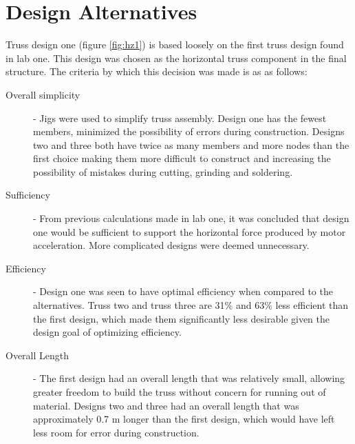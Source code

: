 \section{Design Alternatives}

Truss design one (figure \ref{fig:hz1}) is based loosely on the first truss design found in lab one. 
This design was chosen as the horizontal truss component in the final structure. 
The criteria by which this decision was made is as as follows:

\begin{description}

\item[Overall simplicity] - Jigs were used to simplify truss assembly.
Design one has the fewest members, minimized the possibility of errors during construction.
Designs two and three both have twice as many members and more nodes than the first choice making them more difficult to construct and increasing the possibility of mistakes during cutting, grinding and soldering.

\item[Sufficiency] - %
From previous calculations made in lab one, it was concluded that design one would be sufficient to support the horizontal force produced by motor acceleration.
More complicated designs were deemed unnecessary.

\item[Efficiency] - Design one was seen to have optimal efficiency when compared to the alternatives.
Truss two and truss three are 31\% and 63\% less efficient than the first design, which made them significantly less desirable given the design goal of optimizing efficiency. 

\item[Overall Length] - The first design had an overall length that was relatively small, allowing greater freedom to build the truss without concern for running out of material. 
Designs two and three had an overall length that was approximately 0.7 m longer than the first design, which would have left less room for error during construction.

\end{description}